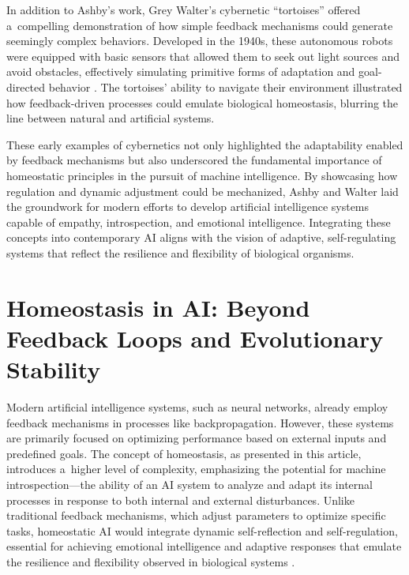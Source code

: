 \documentclass[%
  manuscript=article,
  year=2024,
  volume=77,
  doi=00000.000,
]{zfn}
\begin{document}
In addition to Ashby's work, Grey Walter's cybernetic ``tortoises'' offered a~compelling demonstration of how simple feedback mechanisms could generate seemingly complex behaviors. Developed in the 1940s, these autonomous robots were equipped with basic sensors that allowed them to seek out light sources and avoid obstacles, effectively simulating primitive forms of adaptation and goal-directed behavior 
\parencite[][]{walter_imitation_1950}. %
 The tortoises' ability to navigate their environment illustrated how feedback-driven processes could emulate biological homeostasis, blurring the line between natural and artificial systems.



These early examples of cybernetics not only highlighted the adaptability enabled by feedback mechanisms but also underscored the fundamental importance of homeostatic principles in the pursuit of machine intelligence. By showcasing how regulation and dynamic adjustment could be mechanized, Ashby and Walter laid the groundwork for modern efforts to develop artificial intelligence systems capable of empathy, introspection, and emotional intelligence. Integrating these concepts into contemporary AI aligns with the vision of adaptive, self-regulating systems that reflect the resilience and flexibility of biological organisms.



\section*{Homeostasis in AI: Beyond Feedback Loops and Evolutionary Stability}

Modern artificial intelligence systems, such as neural networks, already employ feedback mechanisms in processes like backpropagation. However, these systems are primarily focused on optimizing performance based on external inputs and predefined goals. The concept of homeostasis, as presented in this article, introduces a~higher level of complexity, emphasizing the potential for machine introspection---the ability of an AI system to analyze and adapt its internal processes in response to both internal and external disturbances. Unlike traditional feedback mechanisms, which adjust parameters to optimize specific tasks, homeostatic AI would integrate dynamic self-reflection and self-regulation, essential for achieving emotional intelligence and adaptive responses that emulate the resilience and flexibility observed in biological systems 
\parencites[][]{damasio_nature_2013}[][]{gros_emotions_2021}.%
\end{document}
